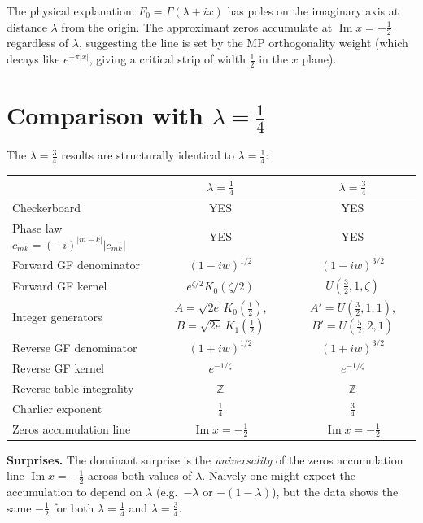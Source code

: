 \documentclass[11pt,a4paper]{article}
\newcommand{\Z}{\mathbb{Z}}
\begin{document}
The physical explanation: $F_0 = \Gamma(\lambda + ix)$ has poles on the imaginary
axis at distance $\lambda$ from the origin. The approximant zeros accumulate
at $\operatorname{Im} x = -\tfrac12$ regardless of $\lambda$, suggesting the line
is set by the MP orthogonality weight (which decays like $e^{-\pi|x|}$, giving
a critical strip of width $\tfrac12$ in the $x$ plane).

\section{Comparison with $\lambda = \tfrac14$}

The $\lambda = \tfrac34$ results are structurally identical to $\lambda = \tfrac14$:

\begin{center}
\begin{tabular}{lcc}
\toprule
 & $\lambda = \tfrac14$ & $\lambda = \tfrac34$ \\
\midrule
Checkerboard & YES & YES \\
Phase law $c_{mk} = (-i)^{|m-k|}|c_{mk}|$ & YES & YES \\
Forward GF denominator & $(1-iw)^{1/2}$ & $(1-iw)^{3/2}$ \\
Forward GF kernel & $e^{\zeta/2} K_0(\zeta/2)$ & $U(\tfrac32, 1, \zeta)$ \\
Integer generators & \small$A{=}\sqrt{2e}\,K_0(\tfrac12)$, $B{=}\sqrt{2e}\,K_1(\tfrac12)$ & \small$A'{=}U(\tfrac32,1,1)$, $B'{=}U(\tfrac52,2,1)$ \\
Reverse GF denominator & $(1+iw)^{1/2}$ & $(1+iw)^{3/2}$ \\
Reverse GF kernel & $e^{-1/\zeta}$ & $e^{-1/\zeta}$ \\
Reverse table integrality & $\Z$ & $\Z$ \\
Charlier exponent & $\tfrac14$ & $\tfrac34$ \\
Zeros accumulation line & $\operatorname{Im} x = -\tfrac12$ & $\operatorname{Im} x = -\tfrac12$ \\
\bottomrule
\end{tabular}
\end{center}

\bigskip

\noindent\textbf{Surprises.}
The dominant surprise is the \emph{universality} of the zeros accumulation line
$\operatorname{Im} x = -\tfrac12$ across both values of $\lambda$. Naively one might
expect the accumulation to depend on $\lambda$ (e.g.\ $-\lambda$ or $-(1-\lambda)$),
but the data shows the same $-\tfrac12$ for both $\lambda = \tfrac14$ and $\lambda = \tfrac34$.
\end{document}
